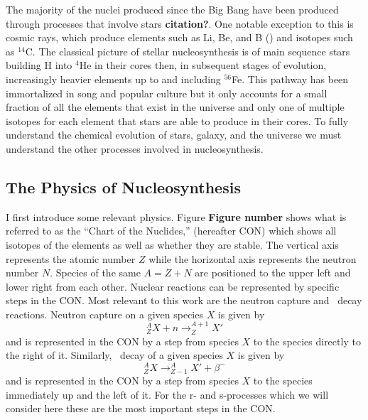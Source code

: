 The majority of the nuclei produced since the Big Bang have been
produced through processes that involve stars {\bf citation?}.  One
notable exception to this is cosmic rays, which produce elements such
as Li, Be, and B (\citealt{meneguzzi1971}) and isotopes such as
$^{14}$C.  The classical picture of stellar nucleosynthesis is of main
sequence stars
building H into $^4$He in their cores then, in subsequent stages of
evolution, increasingly heavier elements up to and including
$^{56}$Fe. This pathway has been immortalized in song and popular
culture but it only accounts for a small fraction of all the elements
that exist in the universe and only one of multiple isotopes for each
element that stars are able to produce in their cores.  To fully
understand the chemical evolution of stars, galaxy, and the universe
we must understand the other processes involved in nucleosynthesis.

\subsection{The Physics of Nucleosynthesis}
I first introduce some relevant physics.  Figure {\bf Figure number}
shows what is referred to as the ``Chart of the Nuclides,'' (hereafter
CON) which
shows all isotopes of the elements as well as whether they are
stable.  The vertical axis represents the atomic number $Z$ while the
horizontal axis represents the neutron number $N$.  Species of the
same $A=Z+N$ are positioned to the upper left and lower right from
each other.  Nuclear reactions can be represented by specific steps in
the CON.  Most relevant to this work are the neutron
capture and \bminus\ decay reactions.  Neutron capture on a given
species $X$ is given by
\begin{equation}
^{A}_ZX + n \rightarrow ^{A+1}_ZX'
\end{equation}
and is represented in the CON by a step from species $X$ to the
species directly to the right of it.  Similarly, \bminus\ decay of a
given species $X$ is given by
\begin{equation}
^{A}_ZX  \rightarrow ^{A}_{Z-1}X' + \beta^-
\end{equation}
and is represented in the CON by a step from species $X$ to the
species immediately up and the left of it.  For the r- and s-processes
which we will consider here these are the most important steps in the CON.
